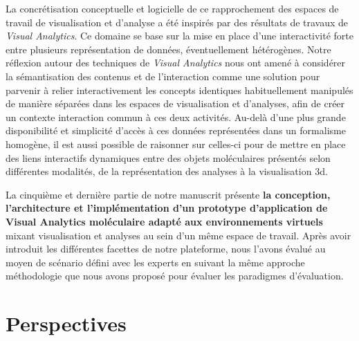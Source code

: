 {La concrétisation conceptuelle et logicielle de ce rapprochement des espaces de travail de visualisation et d'analyse a été inspirés par des résultats de travaux de \textit{Visual Analytics}. Ce domaine se base sur la mise en place d'une interactivité forte entre plusieurs représentation de données, éventuellement hétérogènes. Notre réflexion autour des techniques de \textit{Visual Analytics} nous ont amené à considérer la sémantisation des contenus et de l'interaction comme une solution pour parvenir à relier interactivement les concepts identiques habituellement manipulés de manière séparées dans les espaces de visualisation et d'analyses, afin de créer un contexte interaction commun à ces deux activités. Au-delà d'une plus grande disponibilité et simplicité d'accès à ces données représentées dans un formalisme homogène, il est aussi possible de raisonner sur celles-ci pour de mettre en place des liens interactifs dynamiques entre des objets moléculaires présentés selon différentes modalités, de la représentation des analyses à la visualisation 3d. 

La cinquième et dernière partie de notre manuscrit présente \textbf{la conception, l'architecture et l'implémentation d'un prototype d'application de Visual Analytics moléculaire adapté aux environnements virtuels} mixant visualisation et analyses au sein d'un même espace de travail. Après avoir introduit les différentes facettes de notre plateforme, nous l'avons évalué au moyen de scénario défini avec les experts en suivant la même approche méthodologie que nous avons proposé pour évaluer les paradigmes d'évaluation. 


\section*{Perspectives}



}
